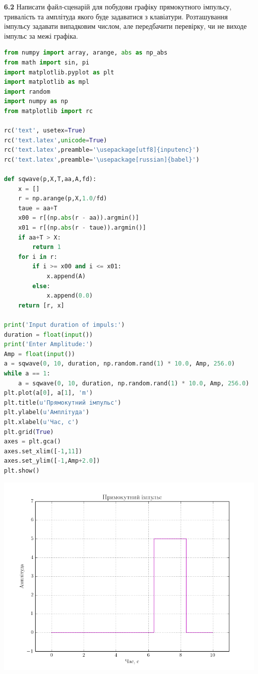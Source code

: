\documentclass[a4paper,12pt]{article}
\begin{document}
\textbf{6.2} Написати файл-сценарій для побудови графіку прямокутного імпульсу, тривалість та амплітуда якого буде задаватися з клавіатури. Розташування імпульсу задавати випадковим числом, але передбачити перевірку, чи не виходе імпульс за межі графіка.


\begin{lstlisting}[language=Python]
from numpy import array, arange, abs as np_abs
from math import sin, pi
import matplotlib.pyplot as plt
import matplotlib as mpl
import random
import numpy as np
from matplotlib import rc

rc('text', usetex=True)
rc('text.latex',unicode=True)
rc('text.latex',preamble='\usepackage[utf8]{inputenc}')
rc('text.latex',preamble='\usepackage[russian]{babel}')

def sqwave(p,X,T,aa,A,fd):
    x = []
    r = np.arange(p,X,1.0/fd)
    taue = aa+T
    x00 = r[(np.abs(r - aa)).argmin()]
    x01 = r[(np.abs(r - taue)).argmin()]
    if aa+T > X:
        return 1
    for i in r:
        if i >= x00 and i <= x01:
            x.append(A)
        else:
            x.append(0.0)
    return [r, x]

print('Input duration of impuls:')
duration = float(input())
print('Enter Amplitude:')
Amp = float(input())
a = sqwave(0, 10, duration, np.random.rand(1) * 10.0, Amp, 256.0)
while a == 1:
    a = sqwave(0, 10, duration, np.random.rand(1) * 10.0, Amp, 256.0)
plt.plot(a[0], a[1], 'm')
plt.title(u'Прямокутний iмпульс')
plt.ylabel(u'Амплiтуда')
plt.xlabel(u'Час, с')
plt.grid(True)
axes = plt.gca()
axes.set_xlim([-1,11])
axes.set_ylim([-1,Amp+2.0])
plt.show()

\end{lstlisting}
\begin{center}
\includegraphics[height = 12 cm,width=15 cm]{6.2.png}
\end{center}
\end{document}

